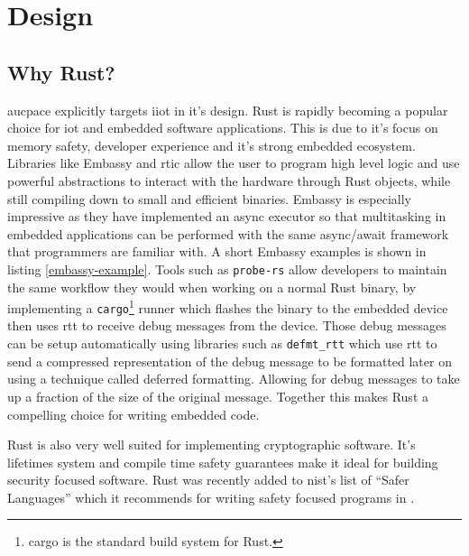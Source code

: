 \chapter{Design}
\label{chap:design}

\section{Why Rust?}
\label{sec:why-rust}

\gls{aucpace} explicitly targets \gls{iiot} in it's design.
Rust is rapidly becoming a popular choice for \gls{iot} and embedded software applications.
This is due to it's focus on memory safety, developer experience and it's strong embedded ecosystem.
Libraries like Embassy and \gls{rtic} allow the user to program high level logic and use powerful abstractions to interact with the hardware through Rust objects, while still compiling down to small and efficient binaries.
Embassy is especially impressive as they have implemented an async executor so that multitasking in embedded applications can be performed with the same async/await framework that programmers are familiar with.
A short Embassy examples is shown in listing \ref{embassy-example}.
Tools such as \texttt{probe-rs} allow developers to maintain the same workflow they would when working on a normal Rust binary, by implementing a \texttt{cargo}\footnote{cargo is the standard build system for Rust.} runner which flashes the binary to the embedded device then uses \gls{rtt} to receive debug messages from the device.
Those debug messages can be setup automatically using libraries such as \texttt{defmt\_rtt} which use \gls{rtt} to send a compressed representation of the debug message to be formatted later on using a technique called deferred formatting.
Allowing for debug messages to take up a fraction of the size of the original message.
Together this makes Rust a compelling choice for writing embedded code.

\medskip{}


Rust is also very well suited for implementing cryptographic software.
It's lifetimes system and compile time safety guarantees make it ideal for building security focused software.
Rust was recently added to \gls{nist}'s list of \enquote{Safer Languages} which it recommends for writing safety focused programs in \cite{nist-safer-languages}.

